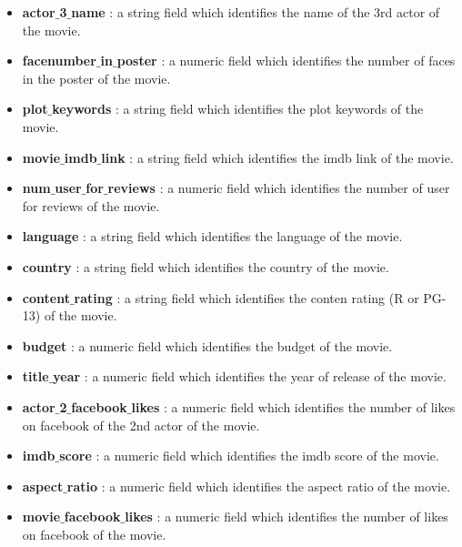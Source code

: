 \documentclass[conference]{IEEEtran}
\begin{document}
\begin{itemize}
	\item \textbf{actor$\_$3$\_$name} : a string field which identifies the name of the 3rd actor of the movie.
	\item \textbf{facenumber$\_$in$\_$poster} : a numeric field which identifies the number of faces in the poster of the movie.
	\item \textbf{plot$\_$keywords}  : a string field which identifies the plot keywords of the movie.
	\item \textbf{movie$\_$imdb$\_$link} : a string field which identifies the imdb link of the movie. 
	\item \textbf{num$\_$user$\_$for$\_$reviews} : a numeric field which identifies the number of user for reviews of the movie. 
	\item \textbf{language}  : a string field which identifies the language of the movie.
	\item \textbf{country}  : a string field which identifies the country of the movie.
	\item \textbf{content$\_$rating} : a string field which identifies the conten rating (R or PG-13) of the movie.
	\item \textbf{budget} : a numeric field which identifies the budget of the movie.
	\item \textbf{title$\_$year} : a numeric field which identifies the year of release of the movie. 
	\item \textbf{actor$\_$2$\_$facebook$\_$likes} : a numeric field which identifies the number of likes on facebook of the 2nd actor of the movie.
	\item \textbf{imdb$\_$score} : a numeric field which identifies the imdb score of the movie.
	\item \textbf{aspect$\_$ratio}  : a numeric field which identifies the aspect ratio of the movie. 
	\item \textbf{movie$\_$facebook$\_$likes}  : a numeric field which identifies the number of likes on facebook of the movie.\\
\end{itemize}
\end{document}
